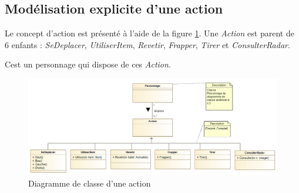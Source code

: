
\subsection{Modélisation explicite d'une action}
\label{sec:question9}

Le concept d'action est présenté à l'aide de la figure \ref{fig:action}. Une \emph{Action} est parent de 6 enfants : \emph{SeDeplacer}, \emph{UtiliserItem}, \emph{Revetir}, \emph{Frapper}, \emph{Tirer} et \emph{ConsulterRadar}.

Cest un personnage qui dispose de ces \emph{Action}.

\begin{figure}
	\centering
	\includegraphics[width=500pt]{assets/class__Action}
	\caption{Diagramme de classe d'une action}
	\label{fig:action}
\end{figure}